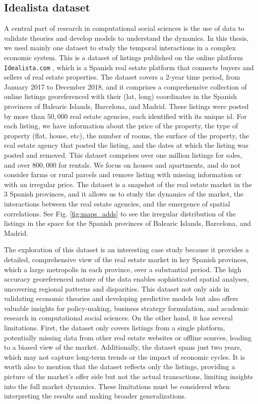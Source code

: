 \subsection{\label{subsec:Idealista dataset} Idealista dataset}

A central part of research in computational social sciences is the use of data to validate theories and develop models to understand the dynamics. In this thesis, we used mainly one dataset to study the temporal interactions in a complex economic system. This is a dataset of listings published on the online platform \texttt{Idealista.com} \cite{idealista}, which is a Spanish real estate platform that connects buyers and sellers of real estate properties. The dataset covers a 2-year time period, from January 2017 to December 2018, and it comprises a comprehensive collection of online listings georeferenced with their (lat, long) coordinates in the Spanish provinces of Balearic Islands, Barcelona, and Madrid. These listings were posted by more than $50,000$ real estate agencies, each identified with its unique id. For each listing, we have information about the price of the property, the type of property (flat, house, etc), the number of rooms, the surface of the property, the real estate agency that posted the listing, and the dates at which the listing was posted and removed. This dataset comprises over one million listings for sales, and over $800,000$ for rentals. We focus on houses and apartments, and do not consider farms or rural parcels and remove listing with missing information or with an irregular price. The dataset is a snapshot of the real estate market in the 3 Spanish provinces, and it allows us to study the dynamics of the market, the interactions between the real estate agencies, and the emergence of spatial correlations. See Fig. \ref{fig:maps_adds} to see the irregular distribution of the listings in the space for the Spanish provinces of Balearic Islands, Barcelona, and Madrid.

The exploration of this dataset is an interesting case study because it provides a detailed, comprehensive view of the real estate market in key Spanish provinces, which a large metropolis in each province, over a substantial period. The high accuracy georeferenced nature of the data enables sophisticated spatial analyses, uncovering regional patterns and disparities. This dataset not only aids in validating economic theories and developing predictive models but also offers valuable insights for policy-making, business strategy formulation, and academic research in computational social sciences. On the other hand, it has several limitations. First, the dataset only covers listings from a single platform, potentially missing data from other real estate websites or offline sources, leading to a biased view of the market. Additionally, the dataset spans just two years, which may not capture long-term trends or the impact of economic cycles. It is worth also to mention that the dataset reflects only the listings, providing a picture of the market's offer side but not the actual transactions, limiting insights into the full market dynamics. These limitations must be considered when interpreting the results and making broader generalizations.

